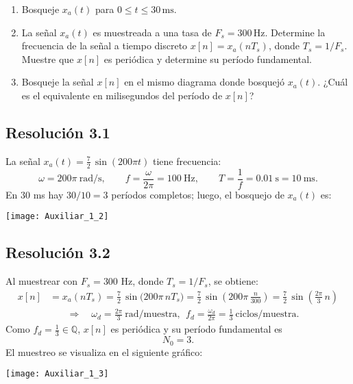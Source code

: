 \documentclass[
  11pt,
  letterpaper,
   addpoints,
  ]{exam}
\begin{document}
\begin{questions}
\begin{enumerate}
  \item Bosqueje \(x_a(t)\) para \(0 \le t \le 30\,\text{ms}\).
  \item La señal \(x_a(t)\) es muestreada a una tasa de \(F_s=300\,\text{Hz}\).
        Determine la frecuencia de la señal a tiempo discreto \(x[n]=x_a(nT_s)\),
        donde \(T_s = 1/F_s\). 
        Muestre que \(x[n]\) es periódica y determine su período fundamental.
  \item Bosqueje la señal \(x[n]\) en el mismo diagrama donde bosquejó \(x_a(t)\).
        ¿Cuál es el equivalente en milisegundos del período de \(x[n]\)?
\end{enumerate}

\begin{solution}

\subsection*{Resolución 3.1}
La señal $x_a(t)=\frac{7}{2}\,\sin(200\pi t)$ tiene frecuencia:
\begin{equation}
\omega = 200\pi\ \text{rad/s}, \qquad f=\frac{\omega}{2\pi}=100\ \text{Hz},
\qquad T=\frac{1}{f}=0.01\ \text{s} = 10\ \text{ms}.
\end{equation}
En \(30\) ms hay \(30/10=3\) períodos completos; luego, el bosquejo de \(x_a(t)\) es:
\begin{center}
  \texttt{[image: Auxiliar\_1\_2]}
\end{center}
\subsection*{Resolución 3.2}
Al muestrear con \(F_s=300\) Hz, donde \(T_s=1/F_s\), se obtiene:
\begin{align}
x[n] &= x_a(nT_s)
  =\frac{7}{2}\,\sin\!\big(200\pi\,nT_s\big)
  =\frac{7}{2}\,\sin\!\left(200\pi\,\frac{n}{300}\right) 
  = \frac{7}{2}\,\sin\!\left(\frac{2\pi}{3}\,n\right)
\end{align}
\begin{align}
  \quad\Rightarrow\quad
  \omega_d=\frac{2\pi}{3}\ \text{rad/muestra},\ \ 
  f_d=\frac{\omega_d}{2\pi}=\frac{1}{3}\ \text{ciclos/muestra}.
\end{align}
Como \(f_d=\tfrac{1}{3}\in\mathbb{Q}\), \(x[n]\) es periódica y su período fundamental es
\begin{equation}
N_0=3.
\end{equation}
El muestreo se visualiza en el siguiente gráfico:
\begin{center}
  \texttt{[image: Auxiliar\_1\_3]}
\end{center}

\end{solution}
\end{questions}
\end{document}
